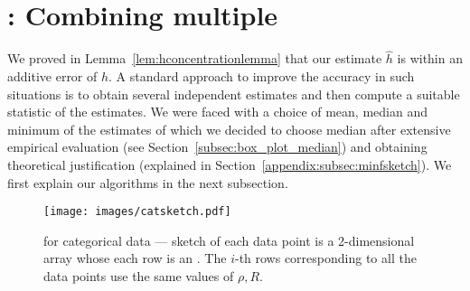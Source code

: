 \section{\minfsketch: Combining multiple \fsketch}\label{subsec:minfsketch}

We proved in Lemma~\ref{lem:hconcentrationlemma} that our estimate $\hat{h}$ is within an additive error of $h$. 
A standard approach to improve the accuracy in such situations is to obtain several independent estimates and then compute a suitable statistic of the estimates. We were faced with a choice of mean, median and minimum of the estimates of which we decided to choose median after extensive empirical evaluation (see Section~{\ref{subsec:box_plot_median}}) and obtaining theoretical justification (explained in Section~\ref{appendix:subsec:minfsketch}). We first explain our algorithms in the next subsection.

\begin{figure}
    \centering
    \texttt{[image: images/catsketch.pdf]}
    \caption{\minfsketch for categorical data --- sketch of each data point is a 2-dimensional array whose each row is an \fsketch. The $i$-th rows corresponding to all the data points use the same values of $\rho,R$.}%
    \label{fig:catsketch-schema}
\end{figure}


